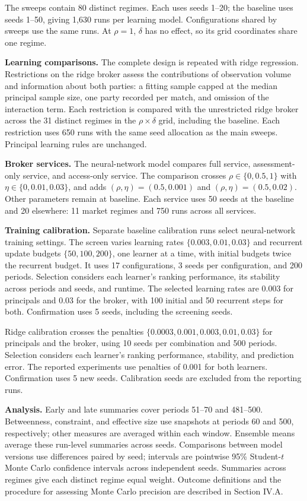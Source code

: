 The sweeps contain 80 distinct regimes. Each uses seeds 1--20; the baseline uses seeds 1--50, giving 1{,}630 runs per learning model. Configurations shared by sweeps use the same runs. At \(\rho=1\), \(\delta\) has no effect, so its grid coordinates share one regime.

\textbf{Learning comparisons.} The complete design is repeated with ridge regression. Restrictions on the ridge broker assess the contributions of observation volume and information about both parties: a fitting sample capped at the median principal sample size, one party recorded per match, and omission of the interaction term. Each restriction is compared with the unrestricted ridge broker across the 31 distinct regimes in the \(\rho\times\delta\) grid, including the baseline. Each restriction uses 650 runs with the same seed allocation as the main sweeps. Principal learning rules are unchanged.

\textbf{Broker services.} The neural-network model compares full service, assessment-only service, and access-only service. The comparison crosses \(\rho\in\{0, 0.5, 1\}\) with \(\eta\in\{0, 0.01, 0.03\}\), and adds \((\rho,\eta)=(0.5,0.001)\) and \((\rho,\eta)=(0.5,0.02)\). Other parameters remain at baseline. Each service uses 50 seeds at the baseline and 20 elsewhere: 11 market regimes and 750 runs across all services.

\textbf{Training calibration.} Separate baseline calibration runs select neural-network training settings. The screen varies learning rates \(\{0.003, 0.01, 0.03\}\) and recurrent update budgets \(\{50, 100, 200\}\), one learner at a time, with initial budgets twice the recurrent budget. It uses 17 configurations, 3 seeds per configuration, and 200 periods. Selection considers each learner's ranking performance, its stability across periods and seeds, and runtime. The selected learning rates are 0.003 for principals and 0.03 for the broker, with 100 initial and 50 recurrent steps for both. Confirmation uses 5 seeds, including the screening seeds.

Ridge calibration crosses the penalties \(\{0.0003, 0.001, 0.003, 0.01, 0.03\}\) for principals and the broker, using 10 seeds per combination and 500 periods. Selection considers each learner's ranking performance, stability, and prediction error. The reported experiments use penalties of 0.001 for both learners. Confirmation uses 5 new seeds. Calibration seeds are excluded from the reporting runs.

\textbf{Analysis.} Early and late summaries cover periods 51--70 and 481--500. Betweenness, constraint, and effective size use snapshots at periods 60 and 500, respectively; other measures are averaged within each window. Ensemble means average these run-level summaries across seeds. Comparisons between model versions use differences paired by seed; intervals are pointwise 95\% Student-\(t\) Monte Carlo confidence intervals across independent seeds. Summaries across regimes give each distinct regime equal weight. Outcome definitions and the procedure for assessing Monte Carlo precision are described in Section IV.A.
